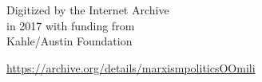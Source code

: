 \vfill

\begin{center}
    \noindent Digitized by the Internet Archive\\
    in 2017 with funding from\\
    Kahle/Austin Foundation
    
    \url{https://archive.org/details/marxismpoliticsOOmili}
\end{center}

